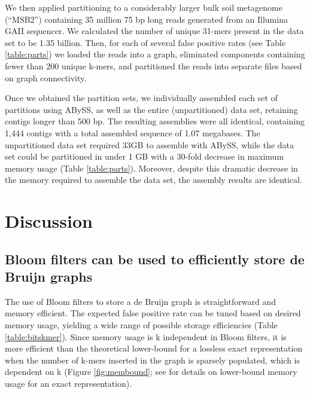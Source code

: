 \documentclass{pnastwo}
\begin{document}
\begin{article}
We then applied partitioning to a considerably larger bulk soil
metagenome (``MSB2'') containing 35 million 75 bp long reads generated
from an Illumina GAII sequencer.  We calculated the number of unique
31-mers present in the data set to be 1.35 billion. Then, for each of
several false positive rates (see Table \ref{table:parts}) we loaded
the reads into a graph, eliminated components containing fewer than
200 unique k-mers, and partitioned the reads into separate files based
on graph connectivity.

Once we obtained the partition sets, we individually assembled each
set of partitions using ABySS, as well as the entire (unpartitioned)
data set, retaining contigs longer than 500 bp.  The resulting
assemblies were all identical, containing 1,444 contigs with a total
assembled sequence of 1.07 megabases.  The unpartitioned data set
required 33GB to assemble with ABySS, while the data set could be
partitioned in under 1 GB with a 30-fold decrease in maximum memory usage
(Table \ref{table:parts}).
Moreover, despite this dramatic decrease in the memory required to assemble
the data set, the assembly results are identical.


\section{Discussion}


\subsection{Bloom filters can be used to efficiently store de Bruijn graphs}

The use of Bloom filters to store a de Bruijn graph is straightforward
and memory efficient.  The expected false positive rate can be tuned
based on desired memory usage, yielding a wide range of possible
storage efficiencies (Table \ref{table:bitskmer}). Since memory usage
is k independent in Bloom filters, it is more efficient than the
theoretical lower-bound for a lossless exact representation when the
number of k-mers inserted in the graph is sparsely populated, which is
dependent on k (Figure \ref{fig:membound}; see \cite{succinct} for
details on lower-bound memory usage for an exact representation).


\end{article}
\end{document}
